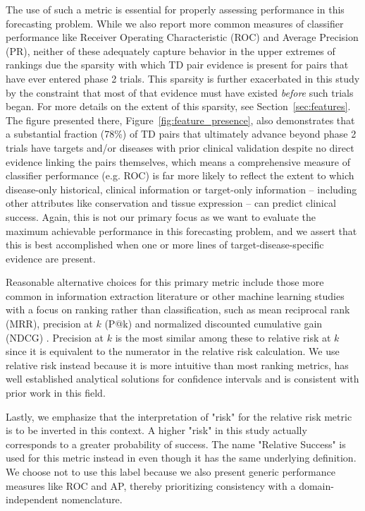 \documentclass{article}
\begin{document}
The use of such a metric is essential for properly assessing performance in this forecasting problem. While we also report more common measures of classifier performance like Receiver Operating Characteristic (ROC) and Average Precision (PR), neither of these adequately capture behavior in the upper extremes of rankings due the sparsity with which TD pair evidence is present for pairs that have ever entered phase 2 trials. This sparsity is further exacerbated in this study by the constraint that most of that evidence must have existed \textit{before} such trials began. For more details on the extent of this sparsity, see Section~\ref{sec:features}. The figure presented there, Figure~\ref{fig:feature_presence}, also demonstrates that a substantial fraction (78\%) of TD pairs that ultimately advance beyond phase 2 trials have targets and/or diseases with prior clinical validation despite no direct evidence linking the pairs themselves, which means a comprehensive measure of classifier performance (e.g. ROC) is far more likely to reflect the extent to which disease-only historical, clinical information or target-only information -- including other attributes like conservation and tissue expression -- can predict clinical success. Again, this is not our primary focus as we want to evaluate the maximum achievable performance in this forecasting problem, and we assert that this is best accomplished when one or more lines of target-disease-specific evidence are present.

Reasonable alternative choices for this primary metric include those more common in information extraction literature or other machine learning studies with a focus on ranking rather than classification, such as mean reciprocal rank (MRR), precision at $k$ (P@k) and normalized discounted cumulative gain (NDCG) \cite{hoyt2022unified,moffat2022batch}. Precision at $k$ is the most similar among these to relative risk at $k$ since it is equivalent to the numerator in the relative risk calculation. We use relative risk instead because it is more intuitive than most ranking metrics, has well established analytical solutions for confidence intervals \cite{Katz1978-mo} and is consistent with prior work in this field.

Lastly, we emphasize that the interpretation of "risk" for the relative risk metric is to be inverted in this context. A higher "risk" in this study actually corresponds to a greater probability of success. The name "Relative Success" is used for this metric instead in \cite{Minikel2023.06.23.23291765} even though it has the same underlying definition. We choose not to use this label because we also present generic performance measures like ROC and AP, thereby prioritizing consistency with a domain-independent nomenclature.
\end{document}
